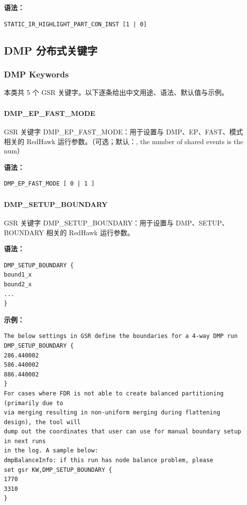 \textbf{语法：}
\begin{lstlisting}
STATIC_IR_HIGHLIGHT_PART_CON_INST [1 | 0]
\end{lstlisting}

\subsection{DMP 分布式关键字}
\subsubsection*{DMP Keywords}

本类共 5 个 GSR 关键字。以下逐条给出中文用途、语法、默认值与示例。

\subsubsection{}
\paragraph*{DMP_EP_FAST_MODE}

GSR 关键字 DMP_EP_FAST_MODE：用于设置与 DMP、EP、FAST、模式 相关的 RedHawk 运行参数。（可选；默认：, the number of shared events is the num）

\textbf{语法：}
\begin{lstlisting}
DMP_EP_FAST_MODE [ 0 | 1 ]
\end{lstlisting}

\subsubsection{}
\paragraph*{DMP_SETUP_BOUNDARY}

GSR 关键字 DMP_SETUP_BOUNDARY：用于设置与 DMP、SETUP、BOUNDARY 相关的 RedHawk 运行参数。

\textbf{语法：}
\begin{lstlisting}
DMP_SETUP_BOUNDARY {
bound1_x
bound2_x
...
}
\end{lstlisting}

\textbf{示例：}
\begin{lstlisting}
The below settings in GSR define the boundaries for a 4-way DMP run
DMP_SETUP_BOUNDARY {
286.440002
586.440002
886.440002
}
For cases where FDR is not able to create balanced partitioning (primarily due to
via merging resulting in non-uniform merging during flattening design), the tool will
dump out the coordinates that user can use for manual boundary setup in next runs
in the log. A sample below:
dmpBalanceInfo: if this run has node balance problem, please
set gsr KW,DMP_SETUP_BOUNDARY {
1770
3310
}
\end{lstlisting}

